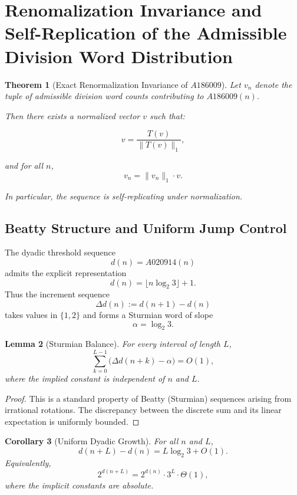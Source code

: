 \documentclass[12pt, oneside]{article}
\numberwithin{equation}{section}
\theoremstyle{definition}
\theoremstyle{plain}
\newtheorem{theorem}{Theorem}[section]
\newtheorem{lemma}[theorem]{Lemma}
\newtheorem{corollary}[theorem]{Corollary}
\theoremstyle{remark}
\begin{document}
\section{Renomalization Invariance and Self-Replication of the Admissible Division Word Distribution}
\label{sec:ren-invariance}

\begin{theorem}[Exact Renormalization Invariance of $A186009$]
Let $v_n$ denote the tuple of admissible division word counts
contributing to $A186009(n)$.

Then there exists a normalized vector $v$ such that:

\[
v = \frac{T(v)}{\|T(v)\|_1},
\]

and for all $n$,
\[
v_n = \|v_n\|_1 \cdot v.
\]

In particular, the sequence is self-replicating under normalization.
\end{theorem}

\subsection{Beatty Structure and Uniform Jump Control}
\label{sec:beatty-structure}

The dyadic threshold sequence
\[
d(n) = A020914(n)
\]
admits the explicit representation
\[
d(n) = \lfloor n \log_2 3 \rfloor + 1.
\]
Thus the increment sequence
\[
\Delta d(n) := d(n+1) - d(n)
\]
takes values in $\{1,2\}$ and forms a Sturmian word of slope
\[
\alpha = \log_2 3.
\]

\begin{lemma}[Sturmian Balance]
\label{lem:sturmian-balance}
For every interval of length $L$,
\[
\sum_{k=0}^{L-1} \bigl(\Delta d(n+k) - \alpha\bigr)
= O(1),
\]
where the implied constant is independent of $n$ and $L$.
\end{lemma}

\begin{proof}
This is a standard property of Beatty (Sturmian) sequences arising from
irrational rotations. The discrepancy between the discrete sum and its
linear expectation is uniformly bounded.
\end{proof}

\begin{corollary}[Uniform Dyadic Growth]
\label{cor:uniform-dyadic}
For all $n$ and $L$,
\[
d(n+L) - d(n) = L \log_2 3 + O(1).
\]
Equivalently,
\[
2^{d(n+L)} = 2^{d(n)} \cdot 3^L \cdot \Theta(1),
\]
where the implicit constants are absolute.
\end{corollary}
\end{document}
